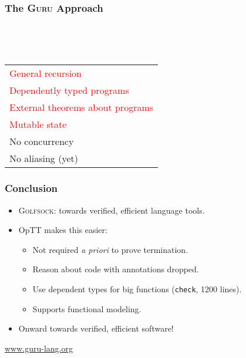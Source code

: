 \documentclass[11pt]{beamer}
\begin{document}
\begin{frame}
  \frametitle{The \textsc{Guru} Approach}

\begin{center}

\ 

\ \ \ \ \ \ \ \ \ \ \ \ \ \ \ \ \ \ \ 
\begin{tabular}{l}
\textcolor{red}{General recursion} \\
\textcolor{red}{Dependently typed programs} \\
\textcolor{red}{External theorems about programs }\\
\textcolor{red}{Mutable state} \\
No concurrency \\ 
No aliasing (yet)
\end{tabular}

\end{center}

\end{frame}


\begin{frame}
\frametitle{Conclusion}
\begin{itemize}
\item \textsc{Golfsock}: towards verified, efficient language tools.
\item OpTT makes this easier:
\begin{itemize}
\item Not required \emph{a priori} to prove termination.
\item Reason about code with annotations dropped.
\item Use dependent types for big functions (\texttt{check}, 1200 lines).
\item Supports functional modeling.
\end{itemize}

\item Onward towards verified, efficient software!
\end{itemize}

\begin{center}
\large
\textcolor{blue}{\url{www.guru-lang.org}}
\end{center}

\end{frame}
\end{document}
